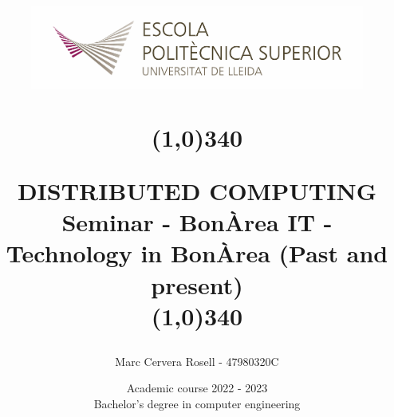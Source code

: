 \title{
	\begin{center}
	\vspace{3cm}
	\includegraphics[width=11cm, height=3cm]{Images/Logo-nou-eps.jpg}
	\end{center}
	\begin{center}
	\line(1,0){340}
	\end{center}		
	DISTRIBUTED COMPUTING\\
	\vspace{2mm}
	\Large Seminar - BonÀrea IT - Technology in BonÀrea (Past and present) \\
	\line(1,0){340}
	\vspace{2.5cm}
	}

\author{Marc Cervera Rosell - 47980320C \vspace{1cm}}


\date{Academic course 2022 - 2023\vspace{0.5cm} \\Bachelor's degree in computer engineering}